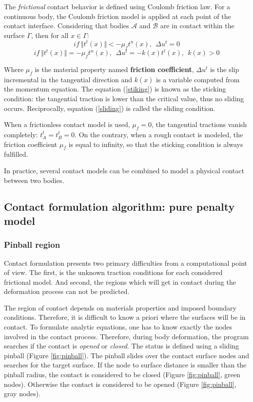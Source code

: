 The \textit{frictional} contact behavior is defined using Coulomb friction law. For a continuous body, the Coulomb friction model is applied at each point of the contact interface.
Considering that bodies $\mathcal{A}$ and $\mathcal{B}$ are in contact within the surface $\Gamma$, then for all $x \in \Gamma$:
\begin{equation}
\label{stiking}
if \ \Vert t^t(x) \Vert < -\mu_f t^n(x),\ \ \Delta u^t=0 
\end{equation}
\begin{equation}
\label{sliding}
if \ \Vert t^t(x) \Vert = -\mu_f t^n(x),\ \ \Delta u^t=-k(x)t^t(x),\ \ k(x)>0
\end{equation}

Where $\mu_f$ is the material property named \textbf{friction coefficient},  $\Delta u^t$ is the slip incremental in the tangential direction and $k(x)$ is a variable computed from the momentum equation. The equation (\ref{stiking}) is known as the sticking condition: the tangential traction is lower than the critical value, thus no sliding occurs. Reciprocally, equation (\ref{sliding}) is called the sliding condition.

When a frictionless contact model is used, $\mu_f = 0$, the tangential tractions vanish completely: $t_A^t = t_B^t = 0$. On the contrary, when a rough contact is modeled, the friction coefficient $\mu_f$ is equal to infinity, so that the sticking condition is always fulfilled. 

In practice, several contact models can be combined to model a physical contact between two bodies.   

\subsection{Contact formulation algorithm: pure penalty model}%

\subsubsection*{Pinball region}

Contact formulation presents two primary difficulties from a computational point of view. The first, is the unknown traction conditions for each considered frictional model. And second, the regions which will get in contact during the deformation process can not be predicted.

The region of contact depends on materials properties and imposed boundary conditions. Therefore, it is difficult to know a priori where the surfaces will be in contact. To formulate analytic equations, one has to know exactly the nodes involved in the contact process. Therefore, during body deformation, the program searches if the contact is \textit{opened} or \textit{closed}. The status is defined using a sliding pinball (Figure \ref{fig:pinball}). The pinball slides over the contact surface nodes and searches for the target surface. If the node to surface distance is smaller than the pinball radius, the contact is considered to be closed (Figure \ref{fig:pinball}, green nodes). Otherwise the contact is considered to be opened (Figure \ref{fig:pinball}, gray nodes).    


